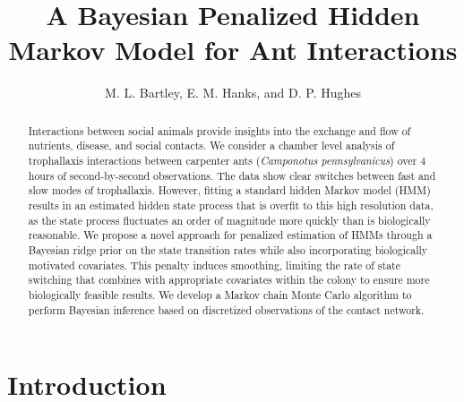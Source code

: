 \documentclass[cmbright,fleqn,referee]{envauth}
\begin{document}
\title{A Bayesian Penalized Hidden Markov Model for Ant Interactions}

\author{M. L. Bartley\corrauth,  E. M. Hanks, and D. P. Hughes}


\address{Department of Statistics, The Pennsylvania State University, University Park, PA, U.S.A.\\
Department of Entomology, The Pennsylvania State University, University Park, PA, U.S.A.
}

\begin{abstract}
Interactions between social animals provide insights into the exchange and flow of nutrients, disease, and social contacts. We consider a chamber level analysis of trophallaxis interactions between carpenter ants (\textit{Camponotus pennsylvanicus}) over 4 hours of second-by-second observations. The data show clear switches between fast and slow modes of trophallaxis. However, fitting a standard hidden Markov model (HMM) results in an estimated hidden state process that is overfit to this high resolution data, as the state process fluctuates an order of magnitude more quickly than is biologically reasonable.  We propose a novel approach for penalized estimation of HMMs through a Bayesian ridge prior on the state transition rates while also incorporating biologically motivated covariates. This penalty induces smoothing, limiting the rate of state switching that combines with appropriate covariates within the colony to ensure more biologically feasible results. We develop a Markov chain Monte Carlo algorithm to perform Bayesian inference based on discretized observations of the contact network. 
\end{abstract}

\maketitle


\section{Introduction}
\label{s:intro}

\end{document}
